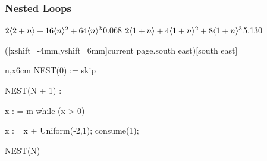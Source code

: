 \documentclass[
11pt,
usepdftitle=false,
aspectratio=169,
xcolor={table,usenames,dvipsnames},
]{beamer}
\begin{document}
\begin{frame}[t,fragile]
  \frametitle{Nested Loops}

  {$2\langle 2+n \rangle + 16\langle n \rangle^2+64\langle n \rangle^3$}{0.068}
  {$2\langle 1+n \rangle + 4\langle 1+n \rangle^2 + 8\langle 1+n \rangle^3$}{5.130}
  {\fail}{}


  \vspace{-10mm}
  \begin{overlayarea}{6.5cm}{4.5cm}
    \vspace{1mm}
    \begin{center}
    \end{center}
    \end{overlayarea}
    
  \begin{floating}([xshift=-4mm,yshift=6mm]current page.south east)[south east]
\begin{codebox}{n,x}{6cm}
NEST(0) := skip


NEST(N + 1) := {
  x : = m
  while (x > 0) {
    x := x + Uniform(-2,1);
    consume(1);

    NEST(N)
  }
}
\end{codebox}
  \end{floating}
\end{frame}
\end{document}
